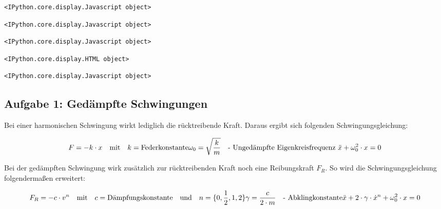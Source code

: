 \documentclass[11pt]{article}
\begin{document}
    
    
    \begin{verbatim}
<IPython.core.display.Javascript object>
    \end{verbatim}

    
    
    \begin{verbatim}
<IPython.core.display.Javascript object>
    \end{verbatim}

    
    
    \begin{verbatim}
<IPython.core.display.Javascript object>
    \end{verbatim}

    
    
    \begin{verbatim}
<IPython.core.display.HTML object>
    \end{verbatim}

    
    
    \begin{verbatim}
<IPython.core.display.Javascript object>
    \end{verbatim}

    
    \subsection{Aufgabe 1: Gedämpfte
Schwingungen}\label{aufgabe-1-geduxe4mpfte-schwingungen}

    Bei einer harmonischen Schwingung wirkt lediglich die rücktreibende
Kraft. Daraus ergibt sich folgenden Schwingungsgleichung:

\[
F = -k \cdot x \quad \text{mit} \quad k=\text{Federkonstante} \\
\omega_0 = \sqrt{\frac{k}{m}}  \quad \text{- Ungedämpfte Eigenkreisfrequenz } \\
\ddot{x} + \omega_0^2 \cdot x = 0
\]

Bei der gedämpften Schwingung wirk zusätzlich zur rücktreibenden Kraft
noch eine Reibungskraft \(F_R\). So wird die Schwingungsgleichung
folgendermaßen erweitert:

\[
F_R = - c \cdot v^n \quad\text{mit}\quad c=\text{Dämpfungskonstante} \quad\text{und}\quad n=\{0,\frac{1}{2}, 1, 2\} \\
\gamma = \frac{c}{2 \cdot m} \quad \text{- Abklingkonstante} \\
\ddot{x} + 2 \cdot \gamma \cdot \dot{x}^n + \omega_0^2 \cdot x = 0
\]
\end{document}
